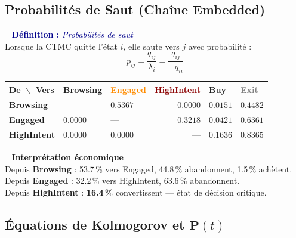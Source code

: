 \documentclass[11pt,a4paper]{article}
\newenvironment{defbox}[1]{%
  \vspace{3pt}\begin{framed}
  \noindent{\color{NavyBlue}\rule{0.3cm}{3pt}}~%
  \textcolor{DarkBlue}{\textbf{Définition :} \textit{#1}}\\[3pt]}
  {\end{framed}\vspace{3pt}}
\newenvironment{insightbox}{%
  \vspace{3pt}\begin{framed}
  \noindent{\color{NavyBlue}\rule{0.3cm}{3pt}}~%
  \textcolor{NavyBlue}{\textbf{Interprétation économique}}\\[3pt]}
  {\end{framed}\vspace{3pt}}
\newcommand{\mat}[1]{\mathbf{#1}}
\begin{document}
\subsection{Probabilités de Saut (Chaîne Embedded)}
\label{sec:saut}

\begin{defbox}{Probabilités de saut}
Lorsque la CTMC quitte l'état $i$, elle saute vers $j$ avec probabilité :
\[
\boxed{p_{ij} = \frac{q_{ij}}{\lambda_i} = \frac{q_{ij}}{-q_{ii}}}
\]
\end{defbox}

\begin{center}
\begin{tabular}{l B O R A V}
\toprule
\textbf{De $\!\backslash\!$ Vers} &
\textcolor{NavyBlue}{\small\textbf{Browsing}} &
\textcolor{DarkOrange}{\small\textbf{Engaged}} &
\textcolor{DarkRed}{\small\textbf{HighIntent}} &
\textcolor{BuyGreen}{\small\textbf{Buy}} &
\textcolor{Gray}{\small\textbf{Exit}} \\
\midrule
\textbf{Browsing}   & --- & $0.5367$ & $0.0000$ & $0.0151$ & $0.4482$ \\
\textbf{Engaged}    & $0.0000$ & --- & $0.3218$ & $0.0421$ & $0.6361$ \\
\textbf{HighIntent} & $0.0000$ & $0.0000$ & --- & $0.1636$ & $0.8365$ \\
\bottomrule
\end{tabular}
\end{center}

\begin{insightbox}
Depuis \textbf{Browsing} : 53.7\,\% vers Engaged, 44.8\,\% abandonnent, 1.5\,\% achètent. \\
Depuis \textbf{Engaged} : 32.2\,\% vers HighIntent, 63.6\,\% abandonnent. \\
Depuis \textbf{HighIntent} : \textbf{16.4\,\%} convertissent --- état de décision critique.
\end{insightbox}

\subsection{Équations de Kolmogorov et $\mat{P}(t)$}
\end{document}
